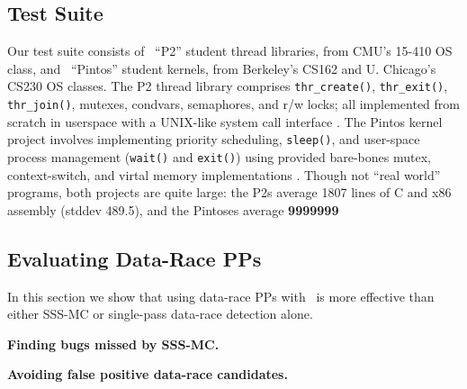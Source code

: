\subsection{Test Suite}
Our test suite consists of \numthrlibs~``P2'' student thread libraries, from CMU's 15-410 OS class,
and \numpintoses~``Pintos'' student kernels, from Berkeley's CS162 and U. Chicago's CS230 OS classes.
%
The P2 thread library comprises \texttt{thr\_create()}, \texttt{thr\_exit()}, \texttt{thr\_join()}, mutexes, condvars, semaphores, and r/w locks;
all implemented from scratch in userspace with a UNIX-like system call interface \cite{kspec,thrlib}.
%
The Pintos kernel project
involves implementing priority scheduling, \texttt{sleep()}, and user-space process management (\texttt{wait()} and \texttt{exit()})
using provided bare-bones mutex, context-switch, and virtal memory implementations
\cite{pintos}.
Though not ``real world'' programs, both projects are quite large: %
the P2s average 1807 lines of C and x86 assembly (stddev 489.5),
and the Pintoses average {\bf 9999999} %




\subsection{Evaluating Data-Race PPs}

In this section we show that using data-race PPs with \landslide~is more effective than either SSS-MC or single-pass data-race detection alone.

{\bf Finding bugs missed by SSS-MC.}

{\bf Avoiding false positive data-race candidates.}

